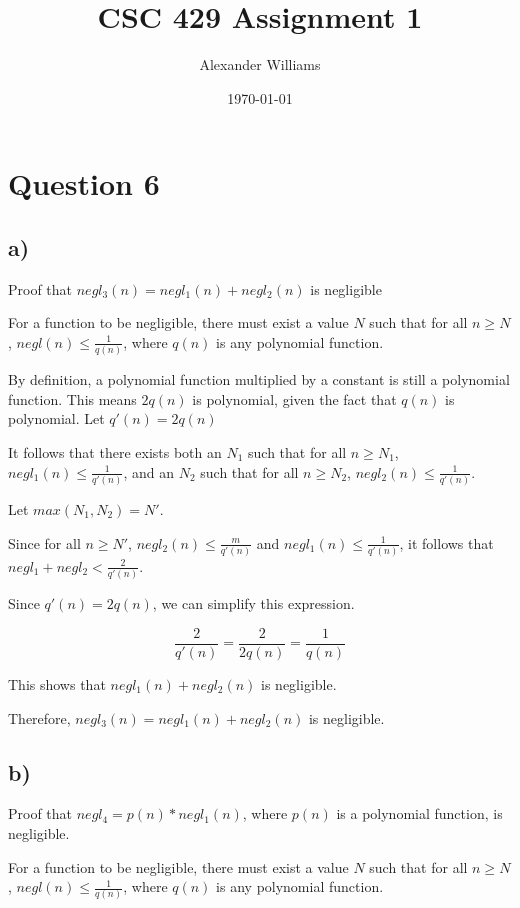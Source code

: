 \documentclass{article}
\title{CSC 429 Assignment 1}
\author{Alexander Williams}
\date{\today}
\begin{document}
\maketitle
\section*{Question 6}

\subsection*{a)}

Proof that $negl_3(n)=negl_1(n)+negl_2(n)$ is negligible

For a function to be negligible, there must exist a value $N$
such that for all $n\geq{}N$, $negl(n)\leq\frac{1}{q(n)}$, where 
$q(n)$ is any polynomial function.

By definition, a polynomial function multiplied by a constant
is still a polynomial function. This means $2q(n)$ is polynomial,
given the fact that $q(n)$ is polynomial. Let $q'(n)=2q(n)$

It follows that there exists both an $N_1$ such that for all $n\geq{}N_1$, 
$negl_1(n)\leq{}\frac{1}{q'(n)}$, and an $N_2$ such that for all $n\geq{}N_2$,
$negl_2(n)\leq{}\frac{1}{q'(n)}$.

Let $max(N_1, N_2)=N'$.

Since for all $n\geq{}N'$, $negl_2(n)\leq{}\frac{m}{q'(n)}$ and $negl_1(n)\leq{}\frac{1}{q'(n)}$,
it follows that $negl_1+negl_2 < \frac{2}{q'(n)}$.

Since $q'(n)=2q(n)$, we can simplify this expression.

$$
\frac{2}{q'(n)}=\frac{2}{2q(n)}=\frac{1}{q(n)}
$$

This shows that $negl_1(n)+negl_2(n)$ is negligible.

Therefore, $negl_3(n)=negl_1(n)+negl_2(n)$ is negligible.



\subsection*{b)}

Proof that $negl_4=p(n)*negl_1(n)$, where $p(n)$ is a polynomial function,
is negligible.

For a function to be negligible, there must exist a value $N$
such that for all $n\geq{}N$, $negl(n)\leq\frac{1}{q(n)}$, where 
$q(n)$ is any polynomial function.
\end{document}

